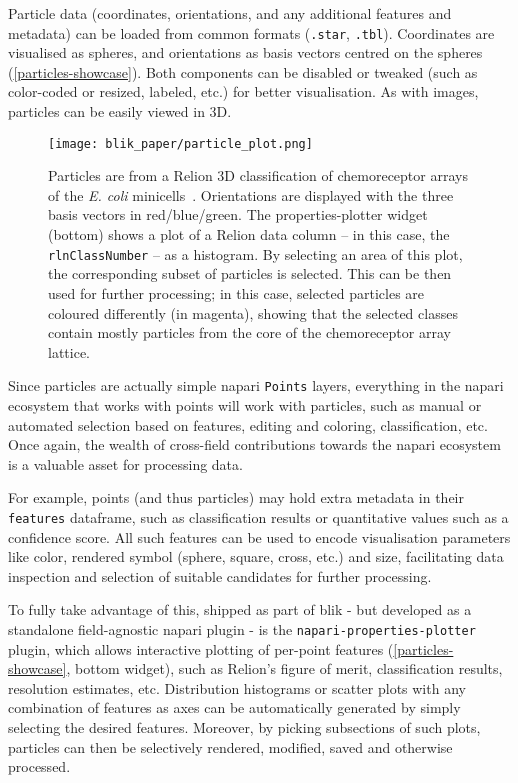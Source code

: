 Particle data (coordinates, orientations, and any additional features and metadata) can be loaded from common formats (\texttt{.star}, \texttt{.tbl}). Coordinates are visualised as spheres, and orientations as basis vectors centred on the spheres (\autoref{particles-showcase}). Both components can be disabled or tweaked (such as color-coded or resized, labeled, etc.) for better visualisation. As with images, particles can be easily viewed in 3D.

\begin{figure}[!ht]
    \centering
    \texttt{[image: blik\_paper/particle\_plot.png]}
    \caption[3D particle visualisation and feature plotting]{Particles are from a Relion 3D classification of chemoreceptor arrays of the \textit{E. coli} minicells~\cite{burtCompleteStructureChemosensory2020}. Orientations are displayed with the three basis vectors in red/blue/green. The properties-plotter widget (bottom) shows a plot of a Relion data column -- in this case, the \texttt{rlnClassNumber} -- as a histogram. By selecting an area of this plot, the corresponding subset of particles is selected. This can be then used for further processing; in this case, selected particles are coloured differently (in magenta), showing that the selected classes contain mostly particles from the core of the chemoreceptor array lattice.}
    \label{particles-showcase}
\end{figure}

Since particles are actually simple napari \texttt{Points} layers, everything in the napari ecosystem that works with points will work with particles, such as manual or automated selection based on features, editing and coloring, classification, etc. Once again, the wealth of cross-field contributions towards the napari ecosystem is a valuable asset for processing data.

For example, points (and thus particles) may hold extra metadata in their \texttt{features} dataframe, such as classification results or quantitative values such as a confidence score. All such features can be used to encode visualisation parameters like color, rendered symbol (sphere, square, cross, etc.) and size, facilitating data inspection and selection of suitable candidates for further processing.

To fully take advantage of this, shipped as part of blik - but developed as a standalone field-agnostic napari plugin - is the \texttt{napari-properties-plotter} plugin, which allows interactive plotting of per-point features (\autoref{particles-showcase}, bottom widget), such as Relion's figure of merit, classification results, resolution estimates, etc. Distribution histograms or scatter plots with any combination of features as axes can be automatically generated by simply selecting the desired features. Moreover, by picking subsections of such plots, particles can then be selectively rendered, modified, saved and otherwise processed.

